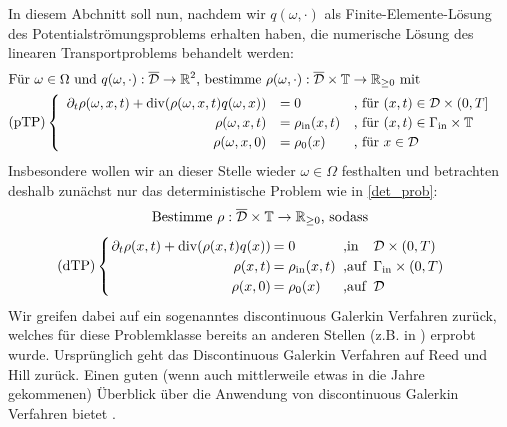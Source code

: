  \label{DG}
In diesem Abchnitt soll nun, nachdem wir $q(\omega,\cdot)$ als Finite-Elemente-Lösung des Potentialströmungsproblems erhalten haben, die numerische Lösung des linearen Transportproblems behandelt werden:
\begin{align*}
	&\text{Für } \omega \in \Omega \text{ und }q(\omega,\cdot): \overline{\mathcal{D}} \to \mathbb{R}^2 \text{, bestimme }\rho(\omega,\cdot): \overline{\mathcal{D}} \times \mathbb{T} \to \mathbb{R}_{\geq 0} \text{ mit} \\
	&\text{(pTP)} 
	\begin{cases}
	\begin{array}{rlll}
	\partial_t \rho (\omega, x, t) + \operatorname{div}(\rho(\omega,x,t)q(\omega,x)) &= 0 &\text{, für } (x,t) \in \mathcal{D} \times (0,T] \\
	\rho(\omega,x,t) &= \rho_{\text{in}}(x,t) &\text{, für } (x,t) \in \Gamma_{\text{in}} \times \mathbb{T} \\
	\rho(\omega,x,0)  &= \rho_0(x) &\text{, für } x \in  \mathcal{D}
	\end{array}
	\end{cases} \\
\end{align*}
Insbesondere wollen wir an dieser Stelle wieder $\omega \in \Omega$ festhalten und betrachten deshalb zunächst nur das deterministische Problem wie in \ref{det_prob}:
\[ 
\text{Bestimme } \rho: \overline{\mathcal{D}} \times \mathbb{T} \to \R_{\geq 0} \text{, sodass} \newline \]
\[\setlength\arraycolsep{1pt}
\text{(dTP)}\begin{cases} 
\begin{array}{rlll}
\partial_t \rho(x,t) + \dive(\rho(x,t) q(x)) &= 0 &\text{ ,in } &\mathcal{D} \times (0,T)\\
\rho(x,t) &= \rho_{\text{in}}(x,t) &\text{ ,auf } &\Gamma_{\text{in}} \times (0,T)\\
\rho(x,0) &= \rho_0(x) &\text{ ,auf } &\mathcal{D} \\
\end{array}
\end{cases} \\
\]
 Wir greifen dabei auf ein sogenanntes discontinuous Galerkin Verfahren zurück, welches für diese Problemklasse bereits an anderen Stellen (z.B. in \cite{cockburn1998runge}) erprobt wurde. Ursprünglich geht das Discontinuous Galerkin Verfahren auf Reed und Hill \cite{reed1973triangular} zurück. Einen guten (wenn auch mittlerweile etwas in die Jahre gekommenen) Überblick über die Anwendung von discontinuous Galerkin Verfahren bietet \cite{cockburn2000development}.

